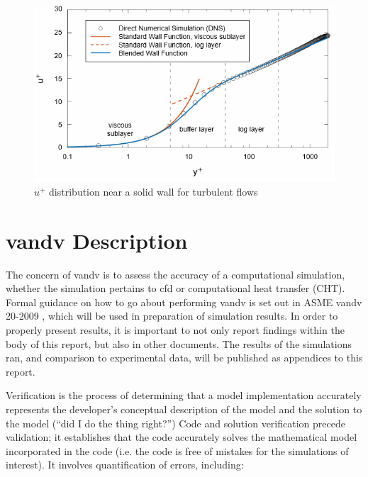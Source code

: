 \documentclass[double,12pt]{beavtex}
\begin{document}
\begin{figure}[!ht]
    \begin{center}
    	\includegraphics[width=13cm]{Figures/Velocity_Distribution_Layers.PNG}
    	\caption{$u^{+}$ distribution near a solid wall for turbulent flows \cite{cd-adapco}}
    	\label{fig:Velocity_Distribution_Layers}
    	\end{center}
\end{figure}



\section{\acrshort{vandv} Description}

The concern of \acrshort{vandv} is to assess the accuracy of a computational simulation, whether the simulation pertains to \acrshort{cfd} or computational heat transfer (CHT). Formal guidance on how to go about performing \acrshort{vandv} is set out in ASME \acrshort{vandv} 20-2009 \cite{vandv}, which will be used in preparation of simulation results. In order to properly present results, it is important to not only report findings within the body of this report, but also in other documents. The results of the simulations ran, and comparison to experimental data, will be published as appendices to this report.

Verification is the process of determining that a model implementation accurately represents the developer’s conceptual description of the model and the solution to the model (“did I do the thing right?”) Code and solution verification precede validation; it establishes that the code accurately solves the mathematical model incorporated in the code (i.e. the code is free of mistakes for the simulations of interest). It involves quantification of errors, including:
\end{document}
